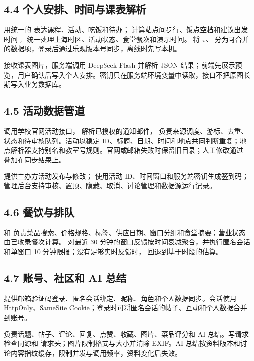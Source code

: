\documentclass[UTF8,a4paper,12pt]{ctexart}
\begin{document}
\subsection{4.4 个人安排、时间与课表解析}
\texttt{} 用统一的 \texttt{} 表达课程、活动、吃饭和待办；\texttt{} 计算站点间步行、饭点空档和建议出发时间；\texttt{} 统一处理上海时区、活动状态、食堂餐次和演示时间。\texttt{} 将 \texttt{}、\texttt{}、\texttt{} 分为可合并的数据项，登录后通过乐观版本号同步，离线时先写本机。\par
\texttt{} 接收课表图片，服务端调用 DeepSeek Flash 并解析 JSON 结果；前端先展示预览，用户确认后写入个人安排。密钥只在服务端环境变量中读取，接口不把原图长期写入业务数据库。\par
\subsection{4.5 活动数据管道}
\texttt{} 调用学校官网活动接口，\texttt{} 解析已授权的通知邮件，\texttt{} 负责来源调度、游标、去重、状态和待审核队列。活动以稳定 ID、标题、日期、时间和地点共同判断重复；地点解析器支持别名和教室号规则。官网或邮箱失败时保留旧目录；人工修改通过 \texttt{} 叠加在同步结果上。\par
\texttt{} 提供主办方活动发布与修改；\texttt{} 使用活动 ID、时间窗口和服务端密钥生成签到码；管理后台支持审核、置顶、隐藏、取消、讨论管理和数据源运行记录。\par
\subsection{4.6 餐饮与排队}
\texttt{} 和 \texttt{} 负责菜品搜索、价格规格、标签、供应日期、窗口分组和食堂摘要；营业状态由已收录餐次计算。\texttt{} 对最近 30 分钟的窗口反馈按时间衰减聚合，并执行匿名会话和单窗口 10 分钟限报；没有足够实时反馈时，\texttt{} 回退到基于时段的估算。\par
\subsection{4.7 账号、社区和 AI 总结}
\texttt{} 提供邮箱验证码登录、匿名会话绑定、昵称、角色和个人数据同步。会话使用 HttpOnly、SameSite Cookie；登录时可将匿名会话的帖子、互动和个人数据合并到账号。\par
\texttt{} 负责话题、帖子、评论、回复、点赞、收藏、图片、菜品评分和 AI 总结。写请求检查同源和 \texttt{} 请求头；图片限制格式与大小并清除 EXIF。AI 总结按资料版本和讨论内容指纹缓存，限制并发与调用频率，资料变化后失效。\par
\end{document}

